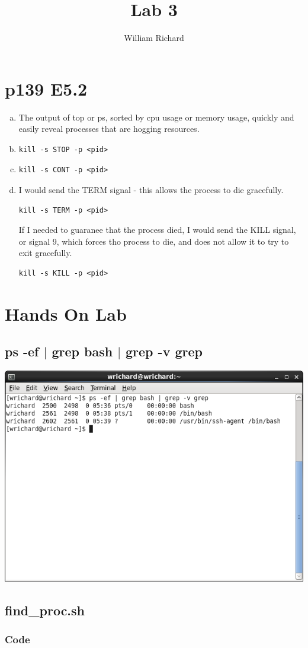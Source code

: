 \documentclass[a4paper,10pt]{article}
\title{Lab 3}
\author{William Richard}
\begin{document}
\maketitle

\section{p139 E5.2}
\begin{enumerate}[(a)]
  \item The output of top or ps, sorted by cpu usage or memory usage, quickly and easily reveal processes that are hogging resources.
  \item 
\begin{verbatim}
kill -s STOP -p <pid>
\end{verbatim}
  \item 
\begin{verbatim}
kill -s CONT -p <pid>
\end{verbatim}
  \item I would send the TERM signal - this allows the process to die gracefully.
\begin{verbatim}
kill -s TERM -p <pid>
\end{verbatim}
If I needed to guaranee that the process died, I would send the KILL signal, or signal 9, which forces tho process to die, and does not allow it to try to exit gracefully.
\begin{verbatim}
kill -s KILL -p <pid>
\end{verbatim}
\end{enumerate}

\section{Hands On Lab}
\subsection{ps -ef $|$ grep bash $|$ grep -v grep}
\begin{center}
 \includegraphics[width=\linewidth]{./grepbash.png}
\end{center}
\subsection{find\_proc.sh}
\subsubsection{Code}

\end{document}
